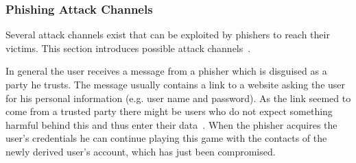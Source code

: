 \subsubsection{Phishing Attack Channels}
Several attack channels exist that can be exploited by phishers to reach their victims.
 This section introduces possible attack channels~\cite{phishing2010ramazan, phishingtechniques}.
 
In general the user receives a message from a phisher which is disguised as a party he trusts.
The message usually contains a link to a website asking the user for his personal information (e.g. user name and password). As the link seemed to come from a trusted party there might be users who do not expect something harmful behind this and thus enter their data~\cite{phishing2010ramazan}.
When the phisher acquires the user's credentials he can continue playing this game with the contacts of the newly derived user's account, which has just been compromised.
 
